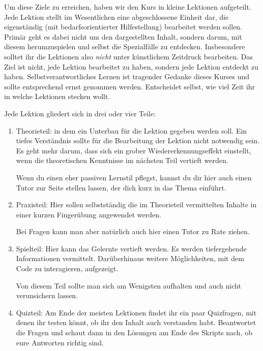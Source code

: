 \documentclass{vorkurs}
\begin{document}
Um diese Ziele zu erreichen, haben wir den Kurs in kleine
Lektionen aufgeteilt. Jede Lektion stellt im Wesentlichen eine abgeschlossene Einheit dar,
die eigenständig (mit bedarfsorientierter Hilfestellung) bearbeitet werden
sollen. Primär geht es dabei nicht um den dargestellten Inhalt, sondern darum,
mit diesem herumzuspielen und selbst die Spezialfälle zu entdecken.
Insbesondere solltet ihr die Lektionen also \emph{nicht} unter künstlichem
Zeitdruck bearbeiten. Das Ziel ist nicht, jede Lektion bearbeitet zu haben,
sondern jede Lektion entdeckt zu haben.  Selbstverantwortliches Lernen ist
tragender Gedanke dieses Kurses und sollte entsprechend ernst genommen werden.
Entscheidet selbst, wie viel Zeit ihr in welche Lektionen stecken wollt.

Jede Lektion gliedert sich in drei oder vier Teile:
\begin{enumerate}
	\item Theorieteil: in dem ein Unterbau für die Lektion gegeben werden
	      soll.  Ein tiefes Verständnis sollte für die Bearbeitung der Lektion
	      nicht notwendig sein. Es geht mehr darum, dass sich ein grober
	      Wiedererkennungseffekt einstellt, wenn die theoretischen Kenntnisse im
	      nächsten Teil vertieft werden.

	      Wenn du einen eher passiven Lernstil pflegst, kannst du dir hier auch
	      einen Tutor zur Seite stellen lassen, der dich kurz in das Thema
	      einführt.

	\item Praxisteil:
	      Hier sollen selbstständig die im Theorieteil vermittelten Inhalte
	      in einer kurzen Fingerübung angewendet werden.

	      Bei Fragen kann man aber natürlich auch hier einen Tutor zu Rate
	      ziehen.

	\item Spielteil: Hier kann das Gelernte vertieft werden.
	      Es werden tiefergehende Informationen vermittelt. Darüberhinaus weitere Möglichkeiten, mit
	      dem Code zu interagieren, aufgezeigt.

	      Von diesem Teil sollte man sich am Wenigsten aufhalten und auch nicht verunsichern lassen.

	\item Quizteil: Am Ende der meisten Lektionen findet ihr ein paar Quizfragen, mit denen ihr testen könnt,
	      ob ihr den Inhalt auch verstanden habt. Beantwortet die Fragen und schaut dann in den Lösungen am Ende des
	      Skripts nach, ob eure Antworten richtig sind.

\end{enumerate}
\end{document}
